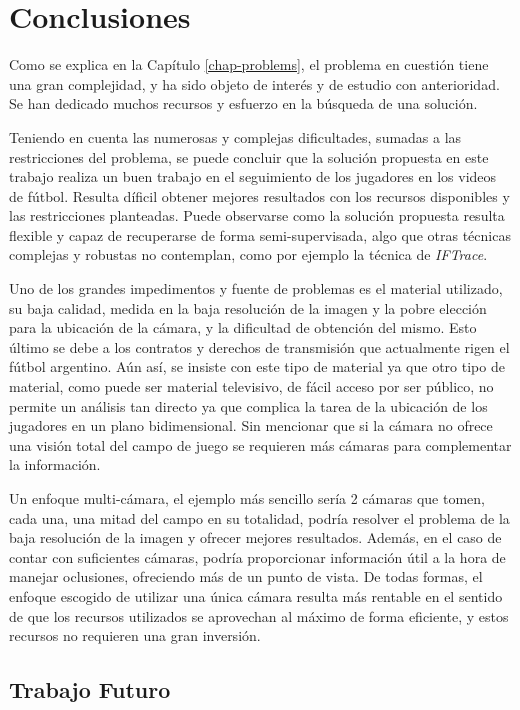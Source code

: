 \chapter{Conclusiones}
\label{chap-conclusion}

Como se explica en la Capítulo \ref{chap-problems}, el problema en cuestión
tiene una gran complejidad, y ha sido objeto de interés y de estudio con
anterioridad. Se han dedicado muchos recursos y esfuerzo en la búsqueda de una
solución.

Teniendo en cuenta las numerosas y complejas dificultades, sumadas a las
restricciones del problema, se puede concluir que la solución propuesta en este
trabajo realiza un buen trabajo en el seguimiento de los jugadores en los
videos de fútbol. Resulta díficil obtener mejores resultados con los recursos
disponibles y las restricciones planteadas. Puede observarse como la solución
propuesta resulta flexible y capaz de recuperarse de forma semi-supervisada,
algo que otras técnicas complejas y robustas no contemplan, como por ejemplo la
técnica de \textit{IFTrace}.

Uno de los grandes impedimentos y fuente de problemas es el material utilizado,
su baja calidad, medida en la baja resolución de la imagen y la pobre elección
para la ubicación de la cámara, y la dificultad de obtención del mismo. Esto
último se debe a los contratos y derechos de transmisión que actualmente rigen
el fútbol argentino. Aún así, se insiste con este tipo de material ya que otro
tipo de material, como puede ser material televisivo, de fácil acceso por ser
público, no permite un análisis tan directo ya que complica la tarea de la
ubicación de los jugadores en un plano bidimensional. Sin mencionar que si la
cámara no ofrece una visión total del campo de juego se requieren más cámaras
para complementar la información.

Un enfoque multi-cámara, el ejemplo más sencillo sería 2 cámaras que tomen,
cada una, una mitad del campo en su totalidad, podría resolver el problema
de la baja resolución de la imagen y ofrecer mejores resultados. Además, en el caso
de contar con suficientes cámaras, podría proporcionar información útil a
la hora de manejar oclusiones, ofreciendo más de un punto de vista. De todas
formas, el enfoque escogido de utilizar una única cámara resulta más rentable
en el sentido de que los recursos utilizados se aprovechan al máximo de forma
eficiente, y estos recursos no requieren una gran inversión.

\section{Trabajo Futuro}

